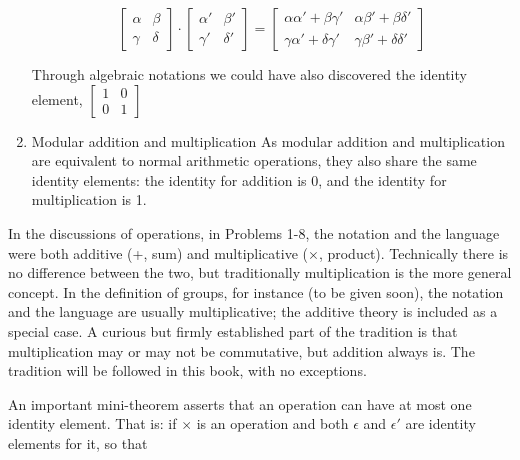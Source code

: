 \begin{enumerate}
          \begin{equation}
              \begin{bmatrix}
                  \alpha & \beta  \\
                  \gamma & \delta
              \end{bmatrix} \boxed{\cdot} \begin{bmatrix}
                  \alpha' & \beta'  \\
                  \gamma' & \delta'
              \end{bmatrix} = \begin{bmatrix}
                  \alpha \alpha' + \beta \gamma'  & \alpha \beta' + \beta \delta'  \\
                  \gamma \alpha' + \delta \gamma' & \gamma \beta' + \delta \delta'
              \end{bmatrix}
          \end{equation}

          Through algebraic notations we could have also discovered the identity element, $\begin{bmatrix}
                  1 & 0 \\ 0 & 1
              \end{bmatrix}$

    \item Modular addition and multiplication
          As modular addition and multiplication are equivalent to normal arithmetic operations, they also share the same identity elements: the identity for addition is 0, and the identity for multiplication is 1.
\end{enumerate}

In the discussions of operations, in Problems 1-8, the notation and the language were both additive (+, sum) and multiplicative ($\times$, product). Technically there is no difference between the two, but traditionally multiplication is the more general concept. In the definition of groups, for instance (to be given soon), the notation and the language are usually multiplicative; the additive theory is included as a special case. A curious but firmly established part of the tradition is that multiplication may or may not be commutative, but addition always is. The tradition will be followed in this book, with no exceptions.

An important mini-theorem asserts that an operation can have at most one identity element. That is: if $\times$ is an operation and both $\epsilon$ and $\epsilon'$ are identity elements for it, so that

